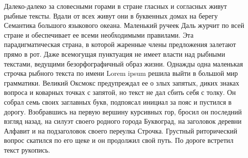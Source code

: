 Далеко-далеко за словесными горами в стране гласных и согласных живут рыбные тексты. Вдали от всех живут они в буквенных домах на берегу Семантика большого языкового океана. Маленький ручеек Даль журчит по всей стране и обеспечивает ее всеми необходимыми правилами. Эта парадигматическая страна, в которой жаренные члены предложения залетают прямо в рот. Даже всемогущая пунктуация не имеет власти над рыбными текстами, ведущими безорфографичный образ жизни. Однажды одна маленькая строчка рыбного текста по имени Lorem ipsum решила выйти в большой мир грамматики. Великий Оксмокс предупреждал ее о злых запятых, диких знаках вопроса и коварных точках с запятой, но текст не дал сбить себя с толку. Он собрал семь своих заглавных букв, подпоясал инициал за пояс и пустился в дорогу. Взобравшись на первую вершину курсивных гор, бросил он последний взгляд назад, на силуэт своего родного города Буквоград, на заголовок деревни Алфавит и на подзаголовок своего переулка Строчка. Грустный риторический вопрос скатился по его щеке и он продолжил свой путь. По дороге встретил текст рукопись.